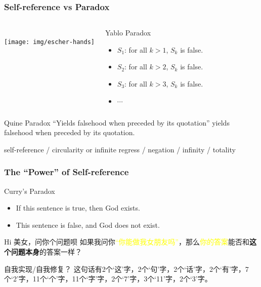 \documentclass[UTF8,11pt,colorlinks,compress,openany]{beamer}%
\begin{document}
\begin{frame}\frametitle{Self-reference vs Paradox}
	\begin{columns}
			\centering{}\\
			\centering\texttt{[image: img/escher-hands]}\\
			\vspace{-1pt}
			\centering{}
		\vspace*{-2ex}
			\begin{block}{Yablo Paradox}
				\begin{itemize}
					\item $S_1$: for all $k>1$, $S_k$ is false.
					\item $S_2$: for all $k>2$, $S_k$ is false.
					\item $S_3$: for all $k>3$, $S_k$ is false.
					\item $\cdots$
				\end{itemize}
			\end{block}
	\end{columns}
\begin{block}{Quine Paradox}
	``Yields falsehood when preceded by its quotation''	yields falsehood when preceded by its quotation.
\end{block}
\begin{block}{}\small
	self-reference / circularity or infinite regress / negation / infinity / totality
\end{block}
\end{frame}

\begin{frame}\frametitle{The ``Power'' of Self-reference}
\begin{block}{Curry's Paradox}
\begin{itemize}
	\item If this sentence is true, then God exists.
	\item This sentence is false, and God does not exist.
\end{itemize}
\end{block}
\begin{block}{Hi 美女，问你个问题呗}
如果我问你\textcolor{yellow}{“你能做我女朋友吗”}，那么\textcolor{yellow}{你的答案}能否和\textbf{这个问题本身}的答案一样？
\end{block}
\begin{block}{自我实现/自我修复？}
这句话有2个‘这’字，2个‘句’字，2个‘话’字，2个‘有’字，7个‘2’字，11个‘个’字，11个‘字’字，2个‘7’字，3个‘11’字，2个‘3’字。
\end{block}
\end{frame}
\end{document}
